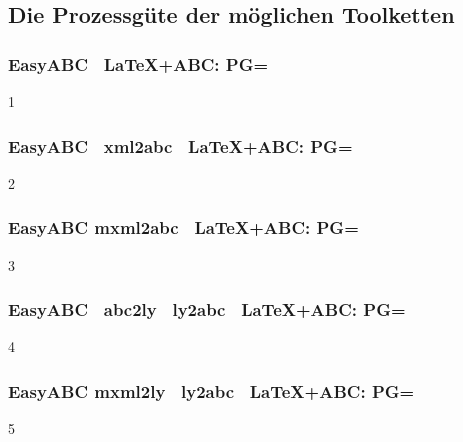 %
%
%

\subsection{Die Prozessgüte der möglichen Toolketten}

\subsubsection{Easy\-ABC \ra\ \LaTeX+ABC: PG=}

1

\subsubsection{Easy\-ABC \ra\ xml2abc \ra\ \LaTeX+ABC: PG=}

2

\subsubsection{Easy\-ABC \ra mxml2abc \ra\ \LaTeX+ABC: PG=}

3

\subsubsection{Easy\-ABC \ra\ abc2ly \ra\ ly2abc \ra\ \LaTeX+ABC: PG=}

4

\subsubsection{Easy\-ABC \ra mxml2ly \ra\ ly2abc \ra\ \LaTeX+ABC: PG=}

5

